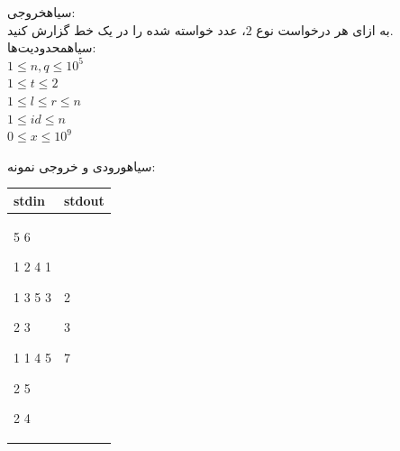 \noindent
{}‌سیاه{خروجی:}\\
به ازای هر درخواست نوع $2$، عدد خواسته شده را در یک خط گزارش کنید.\\
‌سیاه{محدودیت‌ها:}\\
$1\leq n,q\leq 10^5$\\
$1\leq t\leq 2$\\
$1\leq l \leq r\leq n$\\
$1\leq id \leq n$\\
$0 \leq x\leq 10^9$





‌سیاه{ورودی و خروجی نمونه:}\\


\begin{latin}
	\begin{tabularx}{\textwidth}{|X | X|}
		\hline
		\textbf{stdin} &
		\textbf{stdout}\\
		\hline
		5 6
		
		1 2 4 1
		
		1 3 5 3
		
		2 3
		
		1 1 4 5
		
		2 5
		
		2 4&
		2
		
		3
		
		7\\
		\hline
		
	\end{tabularx}
\end{latin}






